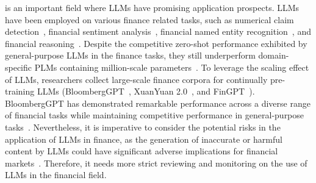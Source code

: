 {
is an important field where LLMs have promising application prospects. 
LLMs have been employed on various finance related tasks, such as numerical claim detection~\cite{Shah-arxiv-2023-Zero}, financial sentiment analysis~\cite{Araci-arxiv-2023-FinBERT}, financial named entity recognition~\cite{Alvarado-ALTA-2015-Domain}, and financial reasoning~\cite{Son-arxiv-2023-Beyond}.
Despite the competitive zero-shot performance exhibited by general-purpose LLMs in the finance tasks, they still underperform domain-specific PLMs containing million-scale  parameters~\cite{Shah-arxiv-2023-Zero}.
To leverage the scaling effect of LLMs, researchers collect large-scale finance corpora for continually pre-training LLMs (\eg BloombergGPT~\cite{wu-arxiv-2023-bloomberggpt}, XuanYuan 2.0~\cite{zhang-arxiv-2023-xuanyuan}, and FinGPT~\cite{Yang-2023-arxiv-FinGPT}).
BloombergGPT has demonstrated remarkable performance across a diverse range of financial tasks while maintaining competitive performance in general-purpose tasks~\cite{wu-arxiv-2023-bloomberggpt}.
Nevertheless, it is imperative to consider the potential risks in the application of LLMs in finance, as the generation of inaccurate or harmful content by LLMs could have significant adverse implications for financial markets~\cite{wu-arxiv-2023-bloomberggpt}.
Therefore, it needs more strict reviewing  and monitoring on the use of LLMs in the financial field. 


}

